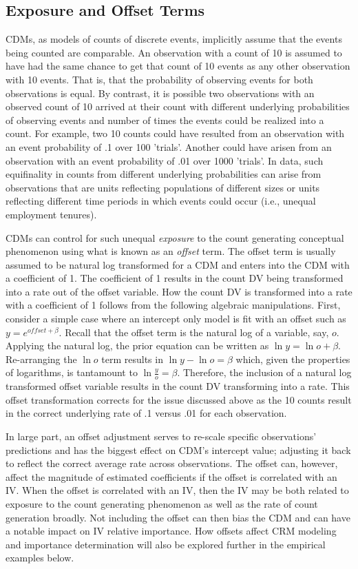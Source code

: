\documentclass[ShortAfour,times,sageapa]{sagej}
\begin{document}
	\subsection{Exposure and Offset Terms}
	
	CDMs, as models of counts of discrete events, implicitly assume that the events being counted are comparable.  
	An observation with a count of 10 is assumed to have had the same chance to get that count of 10 events as any other observation with 10 events.  
	That is, that the probability of observing events for both observations is equal.
	By contrast, it is possible two observations with an observed count of 10 arrived at their count with different underlying probabilities of observing events and number of times the events could be realized into a count.  
	For example, two 10 counts could have resulted from an observation with an event probability of .1 over 100 'trials'.  
	Another could have arisen from an observation with an event probability of .01 over 1000 'trials'.  
	In data, such equifinality in counts from different underlying probabilities can arise from observations that are units reflecting populations of different sizes or units reflecting different time periods in which events could occur (i.e., unequal employment tenures).
	
	CDMs can control for such unequal \emph{exposure} to the count generating conceptual phenomenon using what is known as an \emph{offset} term.  
	The offset term is usually assumed to be natural log transformed for a CDM and enters into the CDM with a coefficient of 1.
	The coefficient of 1 results in the count DV being transformed into a rate out of the offset variable.
	How the count DV is transformed into a rate with a coefficient of 1 follows from the following algebraic manipulations.
	First, consider a simple case where an intercept only model is fit with an offset such as $y = e^{offset + \beta}$.
	Recall that the offset term is the natural log of a variable, say, $o$.  
	Applying the natural log, the prior equation can be written as $\ln y = \ln o + \beta$.
	Re-arranging the $\ln o$ term results in $\ln y - \ln o = \beta$ which, given the properties of logarithms, is tantamount to $\ln \frac{y}{o} = \beta$.
	Therefore, the inclusion of a natural log transformed offset variable results in the count DV transforming into a rate.
	This offset transformation corrects for the issue discussed above as the 10 counts result in the correct underlying rate of .1 versus .01 for each observation.
	
	In large part, an offset adjustment serves to re-scale specific observations' predictions and has the biggest effect on CDM's intercept value; adjusting it back to reflect the correct average rate across observations.
	The offset can, however, affect the magnitude of estimated coefficients if the offset is correlated with an IV.  
	When the offset is correlated with an IV, then the IV may be both related to exposure to the count generating phenomenon as well as the rate of count generation broadly.
	Not including the offset can then bias the CDM and can have a notable impact on IV relative importance.
	How offsets affect CRM modeling and importance determination will also be explored further in the empirical examples below.
	
\end{document}
